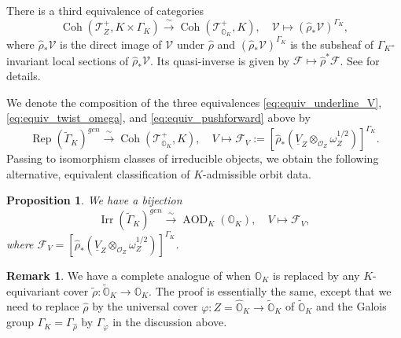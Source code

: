 \documentclass[11pt, a4paper]{amsart}
\newcommand{\orb}{\mathbb{O}}
\newcommand{\orbk}{\orb_{K}}
\newcommand{\torbk}{\widetilde{\orb}_{K}}
\newcommand{\horbk}{\widehat{\orb}_{K}}
\newcommand{\cF}{\mathcal{F}}
\newcommand{\cV}{\mathcal{V}}
\newcommand{\sD}{\mathscr{D}}
\newcommand{\tGamma}{\widetilde{\Gamma}}
\DeclareMathOperator{\AOD}{AOD}
\DeclareMathOperator{\Rep}{Rep}
\DeclareMathOperator{\Coh}{Coh}
\newcommand{\AODK}{\AOD_K}
\newcommand{\smallhalf}{{\scriptscriptstyle 1/2}}
\newcommand{\TT}{\mathscr{T}}
\newcommand{\OO}{\mathcal{O}}
\newcommand{\Irr}{\operatorname{Irr}}
\newtheorem{Prop}[Thm]{Proposition}
\theoremstyle{definition}
\newtheorem{Rem}[Thm]{Remark}
\numberwithin{equation}{section}
\begin{document}

There is a third equivalence of categories
\begin{equation} \label{eq:equiv_pushforward}
	\Coh(\TT^+_Z, K \times \Gamma_K) \xrightarrow{\,\sim\,} \Coh(\TT^+_{\orbk}, K), \quad \cV \mapsto (\hat{\rho}_* \cV)^{\Gamma_K},
\end{equation}
where $\hat{\rho}_* \cV$ is the direct image of $\cV$ under $\hat{\rho}$ and $(\hat{\rho}_* \cV)^{\Gamma_K}$ is the subsheaf of $\Gamma_K$-invariant local sections of $\hat{\rho}_* \cV$.
Its quasi-inverse is given by $\cF \mapsto \hat{\rho}^* \cF$. See \cite[Section 1.8.9]{BeilinsonBernstein} for details.

We denote the composition of the three equivalences \eqref{eq:equiv_underline_V}, \eqref{eq:equiv_twist_omega}, and \eqref{eq:equiv_pushforward} above by 
\begin{equation} \label{eq:classification_adm_vb_cat}
	\Rep(\tGamma_K)^{gen} \xrightarrow{\,\sim\,} \Coh(\TT^+_{\orbk}, K), \quad V \mapsto \cF_V := \left[\hat{\rho}_* (\underline{V}_Z \otimes_{\OO_Z} \omega_Z^{\smallhalf})\right]^{\Gamma_K}.
\end{equation}
Passing to isomorphism classes of irreducible objects, we obtain the following alternative, equivalent classification of $K$-admissible orbit data.

\begin{Prop} \label{prop:classification_AOD}
	We have a bijection
	\begin{equation} \label{eq:classification_adm_vb_irr}
		\Irr(\tGamma_K)^{gen} \xrightarrow{\,\sim\,} \AODK(\orbk), \quad V \mapsto \cF_V,
	\end{equation}
	where $\cF_V = \left[\hat{\rho}_* (\underline{V}_Z \otimes_{\OO_Z} \omega_Z^{\smallhalf})\right]^{\Gamma_K}$.
\end{Prop}

\begin{Rem} \label{rem:classification_AOD_cover}
	We have a complete analogue of  when $\orbk$ is replaced by any $K$-equivariant cover $\tilde{\rho}: \torbk \to \orbk$. The proof is essentially the same, except that we need to replace $\hat{\rho}$ by the universal cover $\varphi: Z=\horbk \to \torbk$ of $\torbk$ and the Galois group $\Gamma_K = \Gamma_{\hat{\rho}}$ by $\Gamma_{\varphi}$ in the discussion above. 
\end{Rem}
\end{document}
